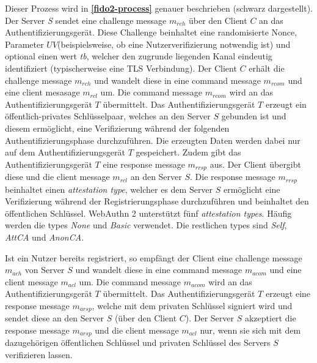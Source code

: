 Dieser Prozess wird in \textbf{\ref{fido2-process}} genauer beschrieben (schwarz dargestellt). Der Server \textit{S} sendet eine challenge message $m_{rch}$ über den Client $C$ an das Authentifizierungsgerät. Diese Challenge beinhaltet eine randomisierte Nonce, Parameter $UV$(beispielsweise, ob eine Nutzerverifizierung notwendig ist) und optional einen wert \textit{tb}, welcher den zugrunde liegenden Kanal eindeutig identifiziert (typischerweise eine \ac{TLS} Verbindung). Der Client $C$ erhält die challenge message $m_{rch}$ und wandelt diese in eine command message $m_{rcom}$ und eine client mesasage $m_{rcl}$ um. Die command message $m_{rcom}$ wird an das Authentifizierungsgerät $T$ übermittelt. Das Authentifizierungsgerät $T$ erzeugt ein öffentlich-privates Schlüsselpaar, welches an den Server $S$ gebunden ist und diesem ermöglicht, eine Verifizierung während der folgenden Authentifizierungsphase durchzuführen. Die erzeugten Daten werden dabei nur auf dem Authentifizierungsgerät $T$ gespeichert. Zudem gibt das Authentifizierungsgerät $T$ eine response message $m_{rrsp}$ aus. Der Client übergibt diese und die client message $m_{rcl}$ an den Server $S$. Die response message $m_{rrsp}$ beinhaltet einen \textit{attestation type}, welcher es dem Server $S$ ermöglicht eine Verifizierung während der Registrierungsphase durchzuführen und beinhaltet den öffentlichen Schlüssel. WebAuthn 2 unterstützt fünf \textit{attestation types}. Häufig werden die types \textit{None} und \textit{Basic} verwendet. Die restlichen types sind \textit{Self}, \textit{AttCA} und \textit{AnonCA}. \cite{bindel2022fido2}

Ist ein Nutzer bereits registriert, so empfängt der Client eine challenge message $m_{ach}$ von Server $S$ und wandelt diese in eine command message $m_{acom}$ und eine client message $m_{acl}$ um. Die command message $m_{acom}$ wird an das Authentifizierungsgerät $T$ übermittelt. Das Authentifizierungsgerät $T$ erzeugt eine response message $m_{arsp}$, welche mit dem privaten Schlüssel signiert wird und sendet diese an den Server $S$ (über den Client $C$). Der Server $S$ akzeptiert die response message $m_{arsp}$ und die client message $m_{acl}$ nur, wenn sie sich mit dem dazugehörigen öffentlichen Schlüssel und privaten Schlüssel des Servers $S$ verifizieren lassen. \cite{bindel2022fido2}

